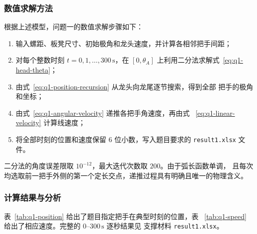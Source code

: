 \documentclass[UTF8,fontset=windows,a4paper,12pt]{ctexart}
\begin{document}
\subsubsection{数值求解方法}

根据上述模型，问题一的数值求解步骤如下：
\begin{enumerate}
  \item 输入螺距、板凳尺寸、初始极角和龙头速度，并计算各相邻把手间距；
  \item 对每个整数时刻 $t=0,1,\ldots,300\,\mathrm{s}$，在
  $[0,\theta_A]$ 上利用二分法求解式~\eqref{eq:q1-head-theta}；
  \item 由式~\eqref{eq:q1-position-recursion} 从龙头向龙尾逐节搜索，得到全部
  把手的极角和坐标；
  \item 由式~\eqref{eq:q1-angular-velocity} 递推各把手角速度，再由式
  ~\eqref{eq:q1-linear-velocity} 计算线速度；
  \item 将全部时刻的位置和速度保留 $6$ 位小数，写入题目要求的
  \texttt{result1.xlsx} 文件。
\end{enumerate}
二分法的角度误差限取 $10^{-12}$，最大迭代次数取 $200$。由于弧长函数单调，
且每次均选取前一把手外侧的第一个定长交点，递推过程具有明确且唯一的物理含义。

\subsubsection{计算结果与分析}

表~\ref{tab:q1-position} 给出了题目指定把手在典型时刻的位置，表
~\ref{tab:q1-speed} 给出了相应速度。完整的 $0$--$300\,\mathrm{s}$ 逐秒结果见
支撑材料 \texttt{result1.xlsx}。
\end{document}
